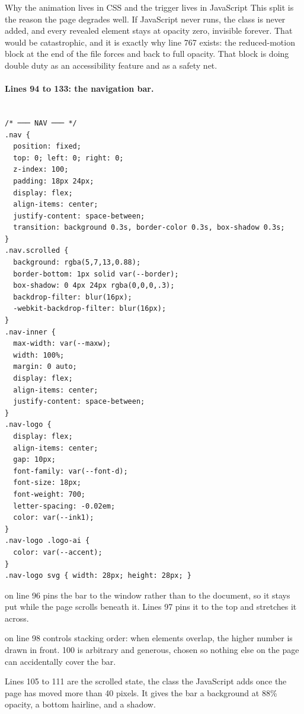 \begin{keyidea}{Why the animation lives in CSS and the trigger lives in JavaScript}
This split is the reason the page degrades well. If JavaScript never runs, the
class  is never added, and every revealed element stays at opacity
zero, invisible forever. That would be catastrophic, and it is exactly why line
767 exists: the reduced-motion block at the end of the file forces
 and  back to full opacity. That block is doing
double duty as an accessibility feature and as a safety net.
\end{keyidea}

\paragraph{Lines 94 to 133: the navigation bar.}

\begin{lstlisting}[firstnumber=93,caption={\file{css/site.css}, lines 93--133}]

/* ─── NAV ─── */
.nav {
  position: fixed;
  top: 0; left: 0; right: 0;
  z-index: 100;
  padding: 18px 24px;
  display: flex;
  align-items: center;
  justify-content: space-between;
  transition: background 0.3s, border-color 0.3s, box-shadow 0.3s;
}
.nav.scrolled {
  background: rgba(5,7,13,0.88);
  border-bottom: 1px solid var(--border);
  box-shadow: 0 4px 24px rgba(0,0,0,.3);
  backdrop-filter: blur(16px);
  -webkit-backdrop-filter: blur(16px);
}
.nav-inner {
  max-width: var(--maxw);
  width: 100%;
  margin: 0 auto;
  display: flex;
  align-items: center;
  justify-content: space-between;
}
.nav-logo {
  display: flex;
  align-items: center;
  gap: 10px;
  font-family: var(--font-d);
  font-size: 18px;
  font-weight: 700;
  letter-spacing: -0.02em;
  color: var(--ink1);
}
.nav-logo .logo-ai {
  color: var(--accent);
}
.nav-logo svg { width: 28px; height: 28px; }
\end{lstlisting}

 on line 96 pins the bar to the window rather than to the
document, so it stays put while the page scrolls beneath it. Lines 97 pins it to
the top and stretches it across.

 on line 98 controls stacking order: when elements overlap, the
higher number is drawn in front. 100 is arbitrary and generous, chosen so nothing
else on the page can accidentally cover the bar.

Lines 105 to 111 are the scrolled state, the class the JavaScript adds once the
page has moved more than 40 pixels. It gives the bar a background at 88\% opacity,
a bottom hairline, and a shadow.

